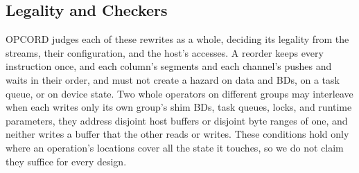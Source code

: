 \subsection{Legality and Checkers}
\label{subsec:legality}

OPCORD judges each of these rewrites as a whole, deciding its legality from the streams, their configuration, and the host's accesses.
A reorder keeps every instruction once, and each column's segments and each channel's pushes and waits in their order, and must not create a hazard on data and BDs, on a task queue, or on device state.
Two whole operators on different groups may interleave when each writes only its own group's shim BDs, task queues, locks, and runtime parameters, they address disjoint host buffers or disjoint byte ranges of one, and neither writes a buffer that the other reads or writes.
These conditions hold only where an operation's locations cover all the state it touches, so we do not claim they suffice for every design.

